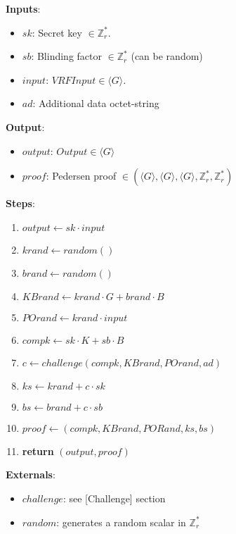 \documentclass[
]{article}
\providecommand{\tightlist}{%
  \setlength{\itemsep}{0pt}\setlength{\parskip}{0pt}}
\begin{document}
\textbf{Inputs}:

\begin{itemize}
\tightlist
\item
  \(sk\): Secret key \(\in \mathbb{Z}^*_r\).
\item
  \(sb\): Blinding factor \(\in \mathbb{Z}^*_r\) (can be random)
\item
  \(input\): \(VRFInput \in \langle G \rangle\).
\item
  \(ad\): Additional data octet-string
\end{itemize}

\textbf{Output}:

\begin{itemize}
\tightlist
\item
  \(output\): \(Output \in \langle G \rangle\)
\item
  \(proof\): Pedersen proof
  \(\in (\langle G \rangle, \langle G \rangle, \langle G \rangle, \mathbb{Z}^*_r, \mathbb{Z}^*_r)\)
\end{itemize}

\textbf{Steps}:

\begin{enumerate}
\def\labelenumi{\arabic{enumi}.}
\tightlist
\item
  \(output \leftarrow sk \cdot input\)
\item
  \(krand \leftarrow random()\)
\item
  \(brand \leftarrow random()\)
\item
  \(KBrand \leftarrow krand \cdot G + brand \cdot B\)
\item
  \(POrand \leftarrow krand \cdot input\)
\item
  \(compk \leftarrow sk \cdot K + sb \cdot B\)
\item
  \(c \leftarrow challenge(compk, KBrand, POrand, ad)\)
\item
  \(ks \leftarrow krand + c \cdot sk\)
\item
  \(bs \leftarrow brand + c \cdot sb\)
\item
  \(proof \leftarrow (compk, KBrand, PORand, ks, bs)\)
\item
  \textbf{return} \((output, proof)\)
\end{enumerate}

\textbf{Externals}:

\begin{itemize}
\tightlist
\item
  \(challenge\): see {[}Challenge{]} section
\item
  \(random\): generates a random scalar in \(\mathbb{Z}^*_r\)
\end{itemize}
\end{document}
